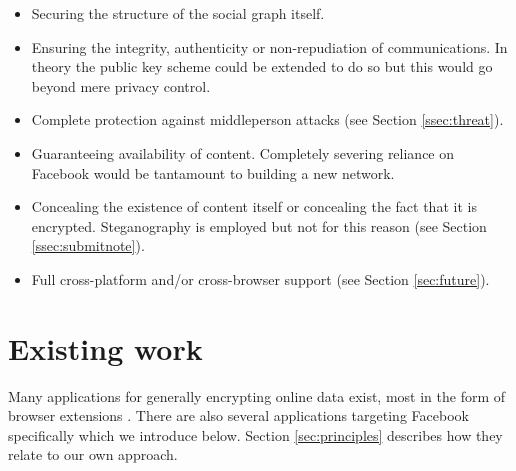 \begin{itemize}

    \item Securing the structure of the social graph itself.
    
    \item Ensuring the integrity, authenticity or non-repudiation of communications. In theory the public key scheme could be extended to do so but this would go beyond mere privacy control.

    \item Complete protection against middleperson attacks (see Section \ref{ssec:threat}).
    
    \item Guaranteeing availability of content. Completely severing reliance on Facebook would be tantamount to building a new network.
    
    \item Concealing the existence of content itself or concealing the fact that it is encrypted. Steganography is employed but not for this reason (see Section \ref{ssec:submitnote}).
    
    \item Full cross-platform and/or cross-browser support (see Section \ref{sec:future}).
    
\end{itemize}


\section{Existing work}
\label{sec:existing}

    Many applications for generally encrypting online data exist, most in the form of browser extensions \cite{firegpg}. There are also several applications targeting Facebook specifically which we introduce below. Section \ref{sec:principles} describes how they relate to our own approach.
    
